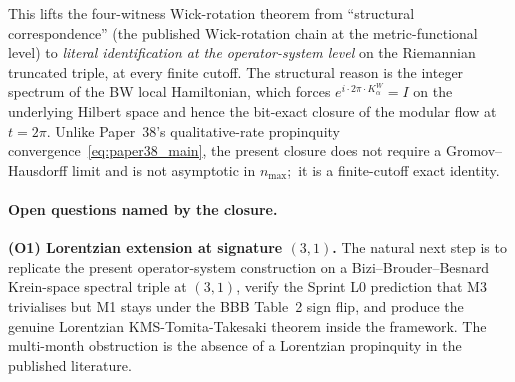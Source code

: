 \documentclass[11pt,a4paper]{article}
\theoremstyle{plain}
\theoremstyle{definition}
\newcommand{\nmax}{n_{\max}}
\begin{document}
This lifts the four-witness Wick-rotation theorem from
``structural correspondence'' (the published Wick-rotation chain at
the metric-functional level) to \emph{literal identification at the
operator-system level} on the Riemannian truncated triple, at every
finite cutoff. The structural reason is the integer spectrum of the
BW local Hamiltonian, which forces $e^{i \cdot 2\pi \cdot K_\alpha^W}
= I$ on the underlying Hilbert space and hence the bit-exact closure
of the modular flow at $t = 2\pi$. Unlike Paper~38's qualitative-rate
propinquity convergence~\eqref{eq:paper38_main}, the present closure
does not require a Gromov--Hausdorff limit and is not asymptotic in
$\nmax$;\ it is a finite-cutoff exact identity.

\paragraph{Open questions named by the closure.}

\textbf{(O1) Lorentzian extension at signature $(3, 1)$.}
The natural next step is to replicate the present operator-system
construction on a Bizi--Brouder--Besnard Krein-space spectral triple
at $(3, 1)$, verify the Sprint L0 prediction that M3 trivialises but
M1 stays under the BBB Table~2 sign flip, and produce the genuine
Lorentzian KMS-Tomita-Takesaki theorem inside the framework. The
multi-month obstruction is the absence of a Lorentzian propinquity in
the published literature.
\end{document}
